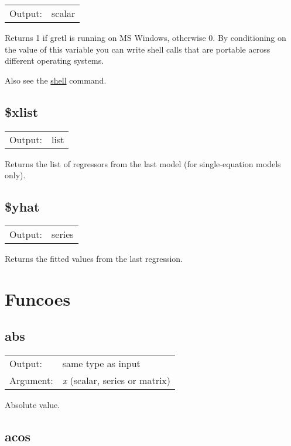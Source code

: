 \begin{tabular}{ll}
Output:     & scalar\\
\end{tabular}

	  Returns 1 if gretl is running on MS Windows, otherwise 0. By
	  conditioning on the value of this variable you can write shell
	  calls that are portable across different operating systems.

	  Also see the \hyperlink{cmd-shell}{shell} command.

\subsection{\$xlist}
\hypertarget{func-dolxlist}{}

\begin{tabular}{ll}
Output:     & list\\
\end{tabular}

	  Returns the list of regressors from the last model (for
	  single-equation models only).

\subsection{\$yhat}
\hypertarget{func-dolyhat}{}

\begin{tabular}{ll}
Output:     & series\\
\end{tabular}

	  Returns the fitted values from the last regression.

\section{Funcoes}
\label{sec:functions}

\subsection{abs}
\hypertarget{func-abs}{}

\begin{tabular}{ll}
Output:     & same type as input\\
Argument:   & \textsl{x} (scalar, series or matrix)\\
\end{tabular}

	  Absolute value.

\subsection{acos}
\hypertarget{func-acos}{}

